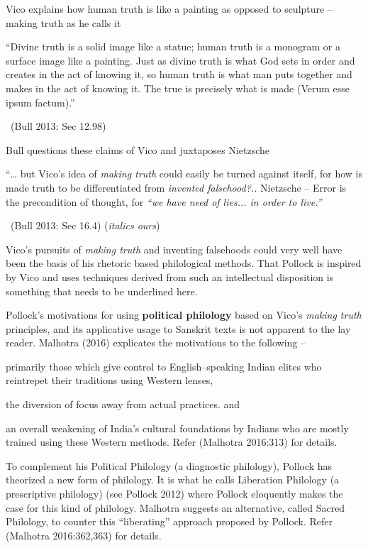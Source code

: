 Vico explains how human truth is like a painting as opposed to sculpture – making truth as he calls it

\begin{myquote}
“Divine truth is a solid image like a statue; human truth is a monogram or a surface image like a painting. Just as divine truth is what God sets in order and creates in the act of knowing it, so human truth is what man puts together and makes in the act of knowing it. The true is precisely what is made (Verum esse ipsum factum).” 

~\hfill (Bull 2013: Sec 12.98)
\end{myquote}

Bull questions these claims of Vico and juxtaposes Nietzsche

\begin{myquote}
“… but Vico’s idea of \textit{making truth} could easily be turned against itself, for how is made truth to be differentiated from \textit{invented falsehood?..} Nietzsche – Error is the precondition of thought, for \textit{“we have need of lies... in order to live.”} 

~\hfill (Bull 2013: Sec 16.4) (\textit{italics ours})
\end{myquote}

Vico’s pursuits of \textit{making truth} and inventing falsehoods could very well have been the basis of his rhetoric based philological methods. That Pollock is inspired by Vico and uses techniques derived from such an intellectual disposition is something that needs to be underlined here.

Pollock’s motivations for using \textbf{political philology} based on Vico’s \textit{making truth} principles, and its applicative usage to Sanskrit texts is not apparent to the lay reader. Malhotra (2016) explicates the motivations to the following –

\item primarily those which give control to English–speaking Indian elites who reintrepet their traditions using Western lenses,

 \item the diversion of focus away from actual practices. and

 \item an overall weakening of India’s cultural foundations by Indians who are mostly trained using these Western methods. Refer (Malhotra 2016:313) for details.

To complement his Political Philology (a diagnostic philology), Pollock has theorized a new form of philology. It is what he calls Liberation Philology (a prescriptive philology) (see Pollock 2012) where Pollock eloquently makes the case for this kind of philology. Malhotra suggests an alternative, called Sacred Philology, to counter this “liberating” approach proposed by Pollock. Refer (Malhotra 2016:362,363) for details.

